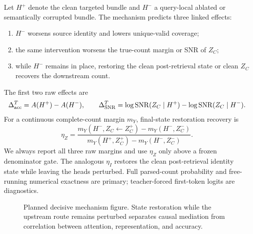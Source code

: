 Let \(H^+\) denote the clean targeted bundle and \(H^-\) a query-local ablated or semantically corrupted bundle. The mechanism predicts three linked effects:
\begin{enumerate}
  \item \(H^-\) worsens source identity and lowers unique-valid coverage;
  \item the same intervention worsens the true-count margin or SNR of \(Z_C\);
  \item while \(H^-\) remains in place, restoring the clean post-retrieval state or clean \(Z_C\) recovers the downstream count.
\end{enumerate}
The first two raw effects are
\begin{equation}
\Delta_{\rm acc}^{T}
=A(H^+)-A(H^-),
\qquad
\Delta_{\rm SNR}^{T}
=\log\operatorname{SNR}(Z_C\mid H^+)-\log\operatorname{SNR}(Z_C\mid H^-).
\label{eq:target-effects}
\end{equation}
For a continuous complete-count margin \(m_Y\), final-state restoration recovery is
\begin{equation}
\eta_Z
=
\frac{
m_Y(H^-,Z_C\leftarrow Z_C^+)-m_Y(H^-,Z_C^-)
}{
m_Y(H^+,Z_C^+)-m_Y(H^-,Z_C^-)
}.
\label{eq:state-restoration}
\end{equation}
We always report all three raw margins and use \(\eta_Z\) only above a frozen denominator gate. The analogous \(\eta_I\) restores the clean post-retrieval identity state while leaving the heads perturbed. Full parsed-count probability and free-running numerical exactness are primary; teacher-forced first-token logits are diagnostics.

\begin{figure}[H]
\centering
{}
\caption{Planned decisive mechanism figure. State restoration while the upstream route remains perturbed separates causal mediation from correlation between attention, representation, and accuracy.}
\label{fig:mediation-todo}
\end{figure}

